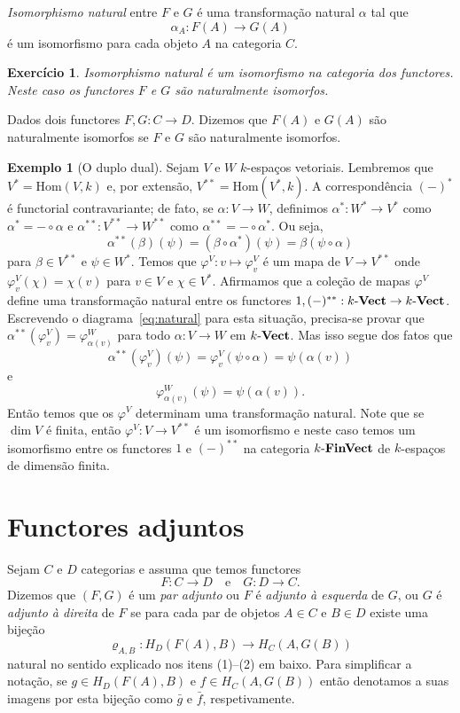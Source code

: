 \documentclass[12pt]{amsart}
\newtheorem{exercise}[theorem]{Exercício}
\theoremstyle{definition}
\newtheorem{example}[theorem]{Exemplo}
\begin{document}
\emph{Isomorphismo natural} entre $F$ e $G$ é uma transformação natural $\alpha$ tal que 
\[
    \alpha_A:F(A)\to G(A)
\] 
é um isomorfismo para cada objeto $A$ na categoria $C$.

\begin{exercise}
Isomorphismo natural é um isomorfismo na categoria dos functores. Neste caso os functores $F$ e $G$ são naturalmente isomorfos. 
\end{exercise}

Dados dois functores $F,G:C\to D$. Dizemos que $F(A)$ e $G(A)$ são naturalmente isomorfos se $F$ e $G$ são naturalmente isomorfos. 


\begin{example}[O duplo dual]
Sejam $V$ e $W$ $k$-espaços vetoriais. Lembremos que $V^*=\mbox{Hom}(V,k)$ e, por extensão, 
$V^{**}=\mbox{Hom}(V^*,k)$. A correspondência $(-)^*$ é functorial contravariante; de fato,
se $\alpha: V\to W$, definimos $\alpha^*:W^*\to V^*$ como $\alpha^*=-\circ \alpha$ e 
$\alpha^{**}: V^{**}\to W^{**}$ como $\alpha^{**}=-\circ \alpha^*$. Ou seja, 
\[
    \alpha^{**}(\beta)(\psi) = (\beta\circ\alpha^*)(\psi)=\beta(\psi\circ \alpha)
\] 
para $\beta\in V^{**}$ e $\psi\in W^*$. Temos que $\varphi^V:v\mapsto \varphi^V_v$ é um mapa de $V\to V^{**}$ onde $\varphi^V_v(\chi)=\chi(v)$ para $v\in V$ e $\chi\in V^*$. Afirmamos que a coleção 
de mapas $\varphi^V$ define uma transformação natural 
entre os functores $1,(-)^{**}:k\mbox{-{\bf Vect}}\to k\mbox{-{\bf Vect}}$. 
Escrevendo o diagrama~\eqref{eq:natural} para esta situação, precisa-se provar que  $\alpha^{**}(\varphi^V_v)=\varphi^W_{\alpha(v)}$ para todo $\alpha:V\to W$ em $k\mbox{-{\bf Vect}}$. Mas isso segue dos fatos que 
$$
    \alpha^{**}(\varphi^V_v)(\psi)=\varphi^V_v(\psi\circ\alpha)=\psi(\alpha(v))
$$
e 
$$
    \varphi^W_{\alpha(v)}(\psi)=\psi(\alpha(v)).
$$
Então temos que os $\varphi^V$ determinam uma transformação natural. Note que se $\dim V$ é finita, então 
$\varphi^V: V\to V^{**}$ é um isomorfismo e neste caso temos um isomorfismo entre os functores $1$ e 
$(-)^{**}$ na categoria $k\mbox{-{\bf FinVect}}$ de $k$-espaços de dimensão finita.
\end{example}

\section{Functores adjuntos}
Sejam $C$ e $D$ categorias e assuma que temos functores 
\[
    F:C\to D\quad\mbox{e}\quad G:D\to C.
\] 
Dizemos que $(F,G)$ é um \emph{par
adjunto} ou $F$ é \emph{adjunto à esquerda} de $G$, ou $G$ é \emph{adjunto à direita} de $F$ se para cada par de 
objetos $A\in C$ e $B\in D$ existe uma bijeção 
\[
    \varrho_{A,B}:H_D(F(A),B)\to H_C(A,G(B))
\]
natural no sentido explicado nos itens (1)--(2) em baixo. 
Para simplificar a notação, 
se $g\in  H_D(F(A),B)$ e $f\in H_C(A,G(B))$ então denotamos a suas imagens por esta bijeção como $\bar g$ e 
$\bar f$, respetivamente.
\end{document}
